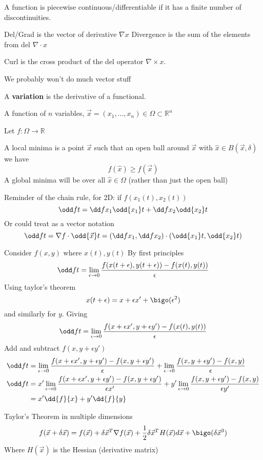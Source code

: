 \documentclass{X:/Documents/Coding/Latex/myassignment}
\begin{document}
A function is piecewise continuous/differentiable if it has a finite number of discontinuities.

Del/Grad is the vector of derivative $\nabla x$
Divergence is the sum of the elements from del $\nabla \cdot x$

Curl is the cross product of the del operator $\nabla \times x$.

We probably won't do much vector stuff



A \textbf{variation} is the derivative of a functional.

A function of $n$ variables, $\vec x = (x_1,\ldots,x_n) \in \Omega \subset \mathbb{R}^n$ 

Let $f : \Omega \to \mathbb{R}$

A local minima is a point $\vec x$ such that an open ball around $\vec x$ with $\hat{x} \in B(\vec x,\delta)$ we have
\[f(\hat{x}) \geq f(\vec x)\]
A global minima will be over all $\hat{x} \in \Omega$ (rather than just the open ball)


Reminder of the chain rule, for 2D: if $f(x_1(t),x_2(t))$
\[\odd ft = \dd f{x_1} \odd{x_1}t + \dd f{x_2} \odd{x_2}t\]
Or could treat as a vector notation
\[\odd ft = \nabla f \cdot \odd{\vec x}t = \left(\dd f{x_1}, \dd f{x_2} \right) \cdot \left(\odd{x_1}t, \odd{x_2}t\right)\]

Consider $f(x,y)$ where $x(t),y(t)$ 
By first principles
\[\odd ft = \lim_{\epsilon\to 0} \frac{f(x(t+\epsilon),y(t+\epsilon)) - f(x(t),y(t))}{\epsilon}\]
Using taylor's theorem
\[x(t+\epsilon) = x + \epsilon x' + \bigo(\epsilon^2)\]
and similarly for $y$.
Giving
\[\odd ft = \lim_{\epsilon\to 0} \frac{f(x + \epsilon x',y + \epsilon y') - f(x(t),y(t))}{\epsilon}\]
Add and subtract $f(x,y+\epsilon y')$ 
\begin{align*}
	\odd ft &= \lim_{\epsilon\to 0} \frac{f(x + \epsilon x',y + \epsilon y') - f(x,y+\epsilon y')}{\epsilon} + \lim_{\epsilon\to 0} \frac{f(x,y+\epsilon y') - f(x,y)}{\epsilon}\\
	\odd ft &= x'\lim_{\epsilon\to 0} \frac{f(x + \epsilon x',y + \epsilon y') - f(x,y+\epsilon y')}{\epsilon x'} + y'\lim_{\epsilon\to 0} \frac{f(x,y+\epsilon y') - f(x,y)}{\epsilon y'}\\
	&= x' \dd{f}{x} + y' \dd{f}{y}
\end{align*}

Taylor's Theorem in multiple dimensions
\[f(\vec x + \delta \vec x) = f(\vec x) + \delta \vec x^T\nabla f(\vec x) + \frac12 \delta \vec x^T H(\vec x) d \vec x + \bigo(\delta \vec x^3)\]
Where $H(\vec x)$ is the Hessian (derivative matrix)
\end{document}
